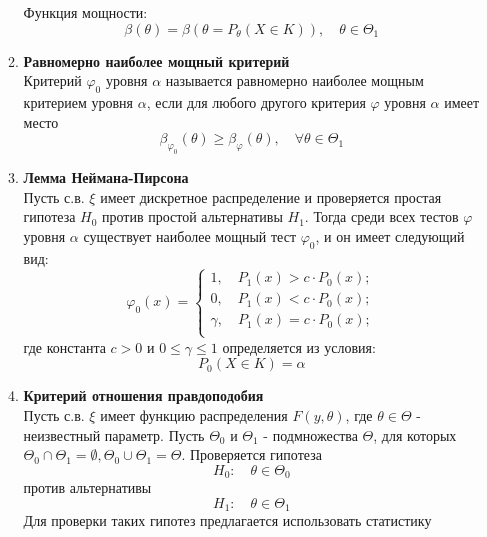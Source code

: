 \documentclass[A4]{article}
\begin{document}
\begin{enumerate}
\begin{enumerate}
		Функция мощности:
		\begin{equation}
		\beta(\theta)=\beta(\theta=P_{\theta}(X\in K)),\quad \theta\in\Theta_1
		\end{equation}
		\item \textbf{Равномерно наиболее мощный критерий}\\
		Критерий $\varphi_0$ уровня $\alpha$ называется равномерно наиболее мощным критерием уровня $\alpha$, если для любого другого критерия $\varphi$ уровня $\alpha$ имеет место
		\begin{equation}
		\beta_{\varphi_0}(\theta)\ge\beta_{\varphi}(\theta),\quad \forall \theta\in \Theta_1
		\end{equation}
		\item \textbf{Лемма Неймана-Пирсона}\\
		Пусть с.в. $\xi$ имеет дискретное распределение и проверяется простая гипотеза $H_0$ против простой альтернативы $H_1$. Тогда среди всех тестов $\varphi$ уровня $\alpha$ существует наиболее мощный тест $\varphi_0$, и он имеет следующий вид:
		\begin{equation}
			\varphi_0(x)=\left\{\begin{array}{l}
		1,\quad P_1(x)>c\cdot P_0(x);\\
		0,\quad P_1(x)<c\cdot P_0(x);\\
		\gamma,\quad P_1(x)=c\cdot P_0(x);\\
		\end{array}\right.
		\end{equation}
		где константа $c>0$ и $0\le\gamma\le1$ определяется из условия:
		\begin{equation}
		P_0(X\in K)=\alpha
		\end{equation}
		\item \textbf{Критерий отношения правдоподобия}\\
		Пусть с.в. $\xi$ имеет функцию распределения $F(y,\theta)$, где $\theta\in\Theta$ - неизвестный параметр. Пусть $\Theta_0$ и $\Theta_1$ - подмножества $\Theta$, для которых $\Theta_0\cap\Theta_1=\emptyset,\Theta_0\cup\Theta_1=\Theta$. Проверяется гипотеза
		\begin{equation}
		H_0:\quad \theta\in\Theta_0
		\end{equation}
		против альтернативы
		\begin{equation}
		H_1:\quad \theta\in\Theta_1
		\end{equation}
		Для проверки таких гипотез предлагается использовать статистику
		\begin{equation}

\end{equation}
\end{enumerate}
\end{enumerate}
\end{document}
